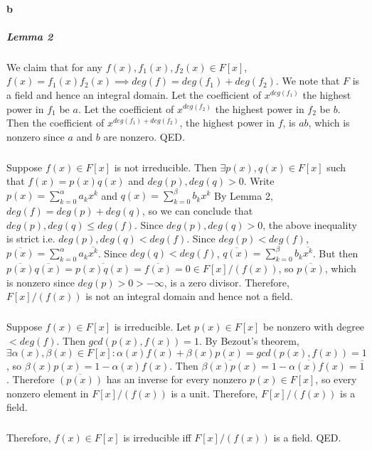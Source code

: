 \documentclass[]{article}
\begin{document}
	\paragraph{b}
	\subparagraph{Lemma 2}
	We claim that for any $f(x), f_1(x), f_2(x) \in F[x]$, $f(x) = f_1(x)f_2(x) \implies deg(f) = deg(f_1) + deg(f_2)$.\newline
	We note that $F$ is a field and hence an integral domain.\newline
	Let the coefficient of $x^{deg(f_1)}$ the highest power in $f_1$ be $a$.\newline
	Let the coefficient of $x^{deg(f_2)}$ the highest power in $f_2$ be $b$.\newline
	Then the coefficient of $x^{deg(f_1) + deg(f_2)}$, the highest power in $f$, is $ab$, which is nonzero since $a$ and $b$ are nonzero.\newline
	QED.
	\subparagraph{}
	Suppose $f(x) \in F[x]$ is not irreducible.\newline
	Then $\exists p(x), q(x) \in F[x]$ such that $f(x) = p(x)q(x)$ and $deg(p), deg(q) > 0$.\newline
	Write $p(x) = \sum_{k=0}^{\alpha} a_kx^k$ and $q(x) = \sum_{k=0}^{\beta} b_kx^k$
	By Lemma 2, $deg(f) = deg(p) + deg(q)$, so we can conclude that $deg(p), deg(q) \le deg(f)$.\newline
	Since $deg(p), deg(q) > 0$, the above inequality is strict i.e. $deg(p), deg(q) < deg(f)$.\newline
	Since $deg(p) < deg(f)$, $\overbar{p(x)} = \sum_{k=0}^{\alpha} a_k\overbar{x^k}$.\newline
	Since $deg(q) < deg(f)$, $\overbar{q(x)} = \sum_{k=0}^{\beta} b_k\overbar{x^k}$.\newline
	But then $\overbar{p(x)}\overbar{q(x)} = \overbar{p(x)q(x)} = \overbar{f(x)} = 0 \in F[x]/(f(x))$, so $\overbar{p(x)}$, which is nonzero since $deg(p) > 0 > -\infty$, is a zero divisor.\newline
	Therefore, $F[x]/(f(x))$ is not an integral domain and hence not a field.
	\subparagraph{}
	Suppose $f(x) \in F[x]$ is irreducible.\newline
	Let $p(x) \in F[x]$ be nonzero with degree $< deg(f)$.\newline
	Then $gcd(p(x), f(x)) = 1$.\newline
	By Bezout's theorem, $\exists \alpha(x), \beta(x) \in F[x]: \alpha(x)f(x) + \beta(x)p(x) = gcd(p(x), f(x)) = 1$, so $\beta(x)p(x) = 1 - \alpha(x)f(x)$.\newline
	Then $\overbar{\beta(x)p(x)} = \overbar{1 - \alpha(x)f(x)} = \overbar{1}$.\newline
	Therefore $\overbar{(p(x))}$ has an inverse for every nonzero $p(x) \in F[x]$, so every nonzero element in $F[x]/(f(x))$ is a unit.\newline
	Therefore, $F[x]/(f(x))$ is a field.
	\subparagraph{}
	Therefore, $f(x) \in F[x]$ is irreducible iff $F[x]/(f(x))$ is a field. QED.
\end{document}
